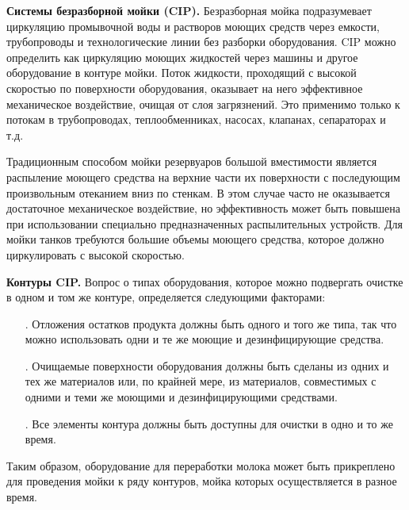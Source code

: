{\par \redline \textbf{Системы безразборной мойки (CIP).} Безразборная мойка подразумевает циркуляцию промывочной воды и растворов моющих средств через емкости, трубопроводы и технологические линии без разборки оборудования. CIP можно определить как циркуляцию моющих жидкостей через машины и другое оборудование в контуре мойки. Поток жидкости, проходящий с высокой скоростью по поверхности оборудования, оказывает на него эффективное механическое воздействие, очищая от слоя загрязнений. Это применимо только к потокам в трубопроводах, теплообменниках, насосах, клапанах, сепараторах и т.д.

\par \redline Традиционным способом мойки резервуаров большой вместимости является распыление моющего средства на верхние части их поверхности с последующим произвольным отеканием вниз по стенкам. В этом случае часто не оказывается достаточное механическое воздействие, но эффективность может быть повышена при использовании специально предназначенных распылительных устройств. Для мойки танков требуются большие объемы моющего средства, которое должно циркулировать с высокой скоростью.

\par \redline \textbf{Контуры CIP.} Вопрос о типах оборудования, которое можно подвергать очистке в одном и том же контуре, определяется следующими факторами:

\begin{itemize}[leftmargin=2.15cm, labelwidth=0.65cm, labelsep=0.0cm] 
	
	\item[\theitemcntr. ] Отложения остатков продукта должны быть одного и того же типа, так что можно использовать одни и те же моющие и дезинфицирующие средства.
	\addtocounter{itemcntr}{1}
	
	\item[\theitemcntr. ] Очищаемые поверхности оборудования должны быть сделаны из одних и тех же материалов или, по крайней мере, из материалов, совместимых с одними и теми же моющими и дезинфицирующими средствами.
	\addtocounter{itemcntr}{1}
	
	\item[\theitemcntr. ] Все элементы контура должны быть доступны для очистки в одно и то же время.
	\addtocounter{itemcntr}{1}
	
	\setcounter{itemcntr}{1}
\end{itemize}

\par \redline Таким образом, оборудование для переработки молока может быть прикреплено для проведения мойки к ряду контуров, мойка которых осуществляется в разное время.

}
